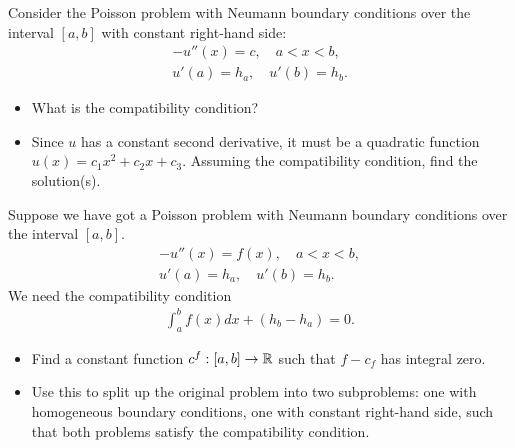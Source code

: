 \documentclass[11pt]{article}
\begin{document}
\begin{exercise}
    Consider the Poisson problem with Neumann boundary conditions over the interval $[a,b]$ with constant right-hand side: 
    \begin{gather*}
        - u''(x) = c, \quad a < x < b,
        \\
        u'(a) = h_a, \quad u'(b) = h_b.
    \end{gather*}
    \begin{itemize}
        \item
        What is the compatibility condition?
        \item 
        Since $u$ has a constant second derivative, it must be a quadratic function $u(x) = c_1 x^2 + c_2 x + c_3$. 
        Assuming the compatibility condition, find the solution(s).
    \end{itemize}
\end{exercise}
\begin{solution}     
\end{solution}

\begin{exercise}
    Suppose we have got a Poisson problem with Neumann boundary conditions over the interval $[a,b]$. 
    \begin{gather*}
        - u''(x) = f(x), \quad a < x < b,
        \\
        u'(a) = h_a, \quad u'(b) = h_b.
    \end{gather*}
    We need the compatibility condition 
    \begin{gather*}
        \int_a^b f(x) dx + ( h_b - h_a ) = 0.
    \end{gather*}
    \begin{itemize}
        \item
        Find a constant function $c^f : [a,b] \to \mathbb{R}$ such that $f - c_f$ has integral zero.
        \item
        Use this to split up the original problem into two subproblems: 
        one with homogeneous boundary conditions, one with constant right-hand side, such that both problems satisfy the compatibility condition.
    \end{itemize}
\end{exercise}
\begin{solution}     
\end{solution}
\end{document}
